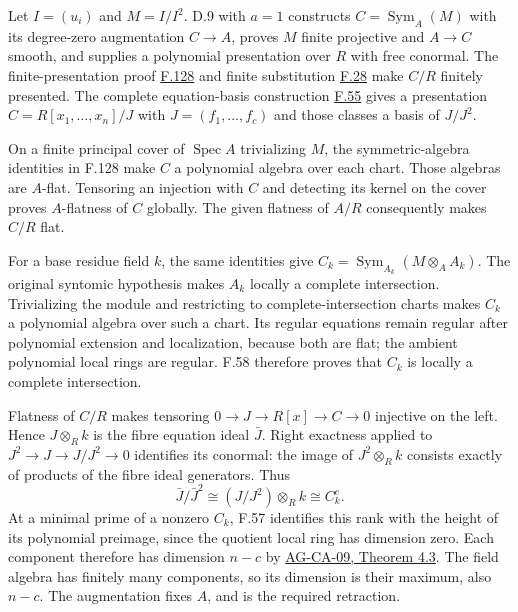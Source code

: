 \documentclass[11pt,a4paper,openany]{report}
\begin{document}
Let \(I=(u_i)\) and \(M=I/I^2\). D.9 with \(a=1\) constructs \(C=\operatorname{Sym}_A(M)\) with its degree-zero augmentation \(C\to A\), proves \(M\) finite projective and \(A\to C\) smooth, and supplies a polynomial presentation over \(R\) with free conormal. The finite-presentation proof \hyperref[AG-RG-S05-more-algebra-lemma-symmetric-algebra-smooth]{F.128} and finite substitution \hyperref[AG-RG-S05-algebra-lemma-compose-finite-type]{F.28} make \(C/R\) finitely presented. The complete equation-basis construction \hyperref[AG-RG-S05-algebra-lemma-huber]{F.55} gives a presentation \(C=R[x_1,\ldots,x_n]/J\) with \(J=(f_1,\ldots,f_c)\) and those classes a basis of \(J/J^2\).

On a finite principal cover of \(\operatorname{Spec}A\) trivializing \(M\), the symmetric-algebra identities in F.128 make \(C\) a polynomial algebra over each chart. Those algebras are \(A\)-flat. Tensoring an injection with \(C\) and detecting its kernel on the cover proves \(A\)-flatness of \(C\) globally. The given flatness of \(A/R\) consequently makes \(C/R\) flat.

For a base residue field \(k\), the same identities give \(C_k=\operatorname{Sym}_{A_k}(M\otimes_A A_k)\). The original syntomic hypothesis makes \(A_k\) locally a complete intersection. Trivializing the module and restricting to complete-intersection charts makes \(C_k\) a polynomial algebra over such a chart. Its regular equations remain regular after polynomial extension and localization, because both are flat; the ambient polynomial local rings are regular. F.58 therefore proves that \(C_k\) is locally a complete intersection.

Flatness of \(C/R\) makes tensoring \(0\to J\to R[x]\to C\to0\) injective on the left. Hence \(J\otimes_R k\) is the fibre equation ideal \(\bar J\). Right exactness applied to \(J^2\to J\to J/J^2\to0\) identifies its conormal: the image of \(J^2\otimes_R k\) consists exactly of products of the fibre ideal generators. Thus \[\bar J/\bar J^2\cong(J/J^2)\otimes_R k\cong C_k^c.\] At a minimal prime of a nonzero \(C_k\), F.57 identifies this rank with the height of its polynomial preimage, since the quotient local ring has dimension zero. Each component therefore has dimension \(n-c\) by \href{https://github.com/KokunoYumeto/open-math-courses/blob/d02d0a3669f42579db037cd44de1d113fdd770a1/docs/courses/AG-CA/src/krull-dimension-and-noether-normalization.md}{AG-CA-09, Theorem 4.3}. The field algebra has finitely many components, so its dimension is their maximum, also \(n-c\). The augmentation fixes \(A\), and is the required retraction.
\end{document}
